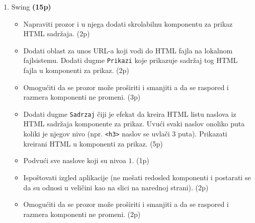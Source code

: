 \documentclass[]{article}
\begin{document}
\begin{enumerate}
  \item Swing \textbf{(15p)}
  \begin{itemize}
    \item Napraviti prozor i u njega dodati skrolabilnu komponentu za prikaz HTML sadr\v{z}aja. \hfill (2p)
    \item Dodati oblast za unos URL-a koji vodi do HTML fajla na lokalnom fajlsistemu. Dodati dugme \texttt{Prikazi} koje prikazuje sadr\v{z}aj tog HTML fajla u komponenti za prikaz. \hfill (2p)
    \item Omogu\'c{}iti da se prozor mo\v{z}e pro\v{s}iriti i smanjiti a da se raspored i razmera komponenti ne promeni. \hfill (3p)
    \item Dodati dugme \texttt{Sadrzaj} \v{c}iji je efekat da kreira HTML listu naslova iz HTML sadr\v{z}aja komponente za prikaz. Uvu\'c{}i svaki naslov onoliko puta koliki je njegov nivo (npr. \texttt{<h3>} naslov se uvla\v{c}i 3 puta). Prikazati kreirani HTML u komponenti za prikaz. \hfill (5p)
    \item Podvu\'c{}i sve naslove koji su nivoa $1$. \hfill (1p)
    \item Ispo\v{s}tovati izgled aplikacije (ne me\v{s}ati redosled komponenti i postarati se da su odnosi u veli\v{c}ini kao na slici na narednoj strani). \hfill (2p)
    \item Omogu\'c{}iti da se prozor mo\v{z}e pro\v{s}iriti i smanjiti a da se raspored i razmera komponenti ne promeni. \hfill (2p)
  \end{itemize}

\end{enumerate}


\newpage
\end{document}
